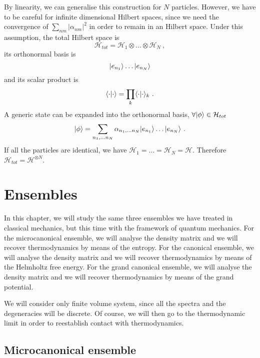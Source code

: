     By linearity, we can generalise this construction for $N$ particles. However, we have to be careful for infinite dimensional Hilbert spaces, since we need the convergence of $\sum_{nm} |\alpha_{nm}|^2$ in order to remain in an Hilbert space. Under this assumption, the total Hilbert space is 
    \begin{equation}\label{comphil}
        \mathcal H_{tot} = \mathcal H_1 \otimes \ldots \otimes \mathcal H_N ~,
    \end{equation}
    its orthonormal basis is 
    \begin{equation*}
        \vert e_{n_1}\rangle \ldots \vert e_{n_N}\rangle 
    \end{equation*}
    and its scalar product is 
    \begin{equation*}
        \langle\cdot\vert\cdot\rangle = \prod_k \langle\cdot\vert\cdot\rangle_k ~.
    \end{equation*}
    A generic state can be expanded into the orthonormal basis, $\forall \vert\phi\rangle \in \mathcal H_{tot}$ 
    \begin{equation*}
        \vert\phi\rangle = \sum_{n_1, \ldots n_N} \alpha_{n_1, \ldots n_N} \vert e_{n_1}\rangle \ldots \vert e_{n_N}\rangle ~.
    \end{equation*}
    If all the particles are identical, we have $\mathcal H_1 = \ldots = \mathcal H_N = \mathcal H$. Therefore $\mathcal H_{tot} = \mathcal H^{\otimes N}$.

\chapter{Ensembles}

    In this chapter, we will study the same three ensembles we have treated in classical mechanics, but this time with the framework of quantum mechanics. For the microcanonical ensemble, we will analyse the density matrix and we will recover thermodynamics by means of the entropy. For the canonical ensemble, we will analyse the density matrix and we will recover thermodynamics by means of the Helmholtz free energy. For the grand canonical ensemble, we will analyse the density matrix and we will recover thermodynamics by means of the grand potential. 

    We will consider only finite volume system, since all the spectra and the degeneracies will be discrete. Of course, we will then go to the thermodynamic limit in order to reestablish contact with thermodynamics.

\section{Microcanonical ensemble}

